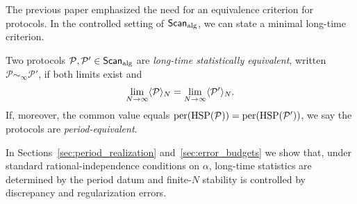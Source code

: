 The previous paper \cite{Ma2025STI} emphasized the need for an equivalence criterion for protocols. In the controlled setting of $\mathsf{Scan}_{\mathrm{alg}}$, we can state a minimal long-time criterion.

\begin{definition}
\label{def:long_time_equivalence}
Two protocols $\mathcal{P},\mathcal{P}'\in\mathsf{Scan}_{\mathrm{alg}}$ are \emph{long-time statistically equivalent}, written $\mathcal{P}\sim_\infty \mathcal{P}'$, if both limits exist and
\begin{equation}
\label{eq:long_time_equivalence}
\lim_{N\to\infty}\langle \mathcal{P} \rangle_N=\lim_{N\to\infty}\langle \mathcal{P}' \rangle_N.
\end{equation}
If, moreover, the common value equals $\mathrm{per}(\mathrm{HSP}(\mathcal{P}))=\mathrm{per}(\mathrm{HSP}(\mathcal{P}'))$, we say the protocols are \emph{period-equivalent}.
\end{definition}

In Sections~\ref{sec:period_realization} and~\ref{sec:error_budgets} we show that, under standard rational-independence conditions on $\alpha$, long-time statistics are determined by the period datum and finite-$N$ stability is controlled by discrepancy and regularization errors.


